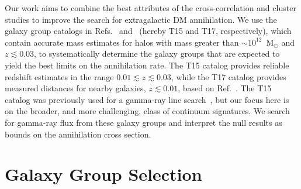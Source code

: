  Our work aims to combine the best attributes of the cross-correlation and cluster studies to improve the search for extragalactic DM annihilation.  We use the galaxy group catalogs in Refs.~\cite{Tully:2015opa} and~\cite{2017ApJ...843...16K} (hereby T15 and T17, respectively), which contain accurate mass estimates for halos with mass greater than $\sim$$10^{12}$~M$_\odot$ and $z \lesssim 0.03$, to systematically determine the galaxy groups that are expected to yield the best limits on the annihilation rate.  The T15 catalog provides reliable redshift estimates in the range $0.01 \lesssim z \lesssim 0.03$, while the T17 catalog provides measured distances for nearby galaxies, $z \lesssim 0.01$, based on Ref.~\cite{Tully:2016ppz}. The T15 catalog was previously used for a gamma-ray line search~\cite{Adams:2016alz}, but our focus here is on the broader, and more challenging, class of continuum signatures.  We search for gamma-ray flux from these galaxy groups and interpret the null results as bounds on the annihilation cross section.   
 
 \section{Galaxy Group Selection}

